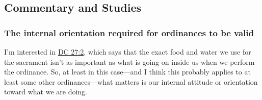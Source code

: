 	
	
	
\subsection{Commentary and Studies} %
	\label{ORDINANCE-COMMENTARY}

	
		
	\subsubsection{The internal orientation required for ordinances to be valid}
		\label{ORDINANCE-internal}
		
		I'm interested in \hyperref[DC27-2]{DC 27:2}, which says that the exact food and water we use for the sacrament isn't as important as what is going on inside us when we perform the ordinance. So, at least in this case---and I think this probably applies to at least some other ordinances---what matters is our internal attitude or orientation toward what we are doing.